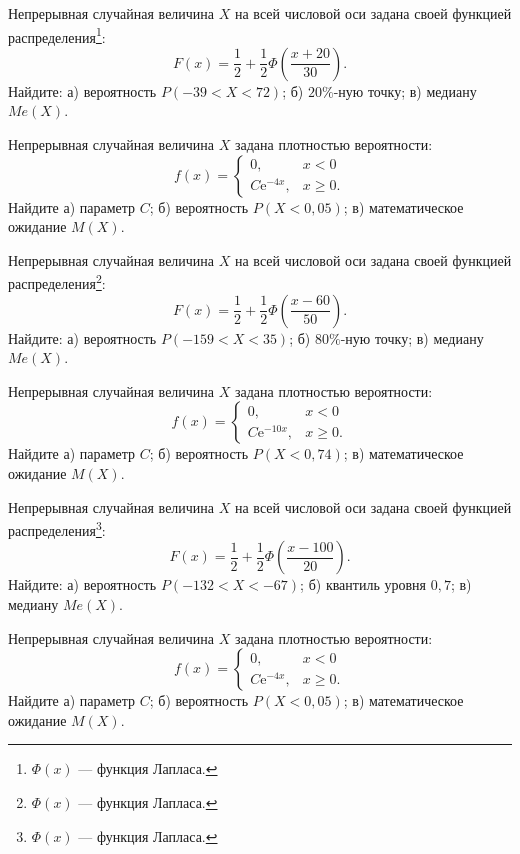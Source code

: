 \vfill

\newpage\setcounter{zad}{0}

\z Непрерывная случайная величина $X$ на всей числовой оси задана своей функцией распределения\footnote{$\Phi(x)$ --- функция Лапласа.}: $$ F(x) = \frac{1}{2} + \frac{1}{2}\Phi\left( \frac{x + 20}{30} \right). $$ Найдите: а) вероятность $P(-39 < X < 72)$; б) $20\%$-ную точку; в) медиану $Me(X)$.


\vfill

\z Непрерывная случайная величина $X$ задана плотностью вероятности: $$ f(x) = \begin{cases}0, & x < 0 \\ C\mathrm{e}^{-4x}, & x \geqslant 0.\end{cases} $$ Найдите а) параметр $C$; б) вероятность $P(X < 0{,}05)$; в) математическое ожидание $M(X)$.
 

\vfill

\newpage\setcounter{zad}{0}

\z Непрерывная случайная величина $X$ на всей числовой оси задана своей функцией распределения\footnote{$\Phi(x)$ --- функция Лапласа.}: $$ F(x) = \frac{1}{2} + \frac{1}{2}\Phi\left( \frac{x - 60}{50} \right). $$ Найдите: а) вероятность $P(-159 < X < 35)$; б) $80\%$-ную точку; в) медиану $Me(X)$.


\vfill

\z Непрерывная случайная величина $X$ задана плотностью вероятности: $$ f(x) = \begin{cases}0, & x < 0 \\ C\mathrm{e}^{-10x}, & x \geqslant 0.\end{cases} $$ Найдите а) параметр $C$; б) вероятность $P(X < 0{,}74)$; в) математическое ожидание $M(X)$.
 

\vfill

\newpage\setcounter{zad}{0}

\z Непрерывная случайная величина $X$ на всей числовой оси задана своей функцией распределения\footnote{$\Phi(x)$ --- функция Лапласа.}: $$ F(x) = \frac{1}{2} + \frac{1}{2}\Phi\left( \frac{x - 100}{20} \right). $$ Найдите: а) вероятность $P(-132 < X < -67)$; б) квантиль уровня $0{,}7$; в) медиану $Me(X)$.


\vfill

\z Непрерывная случайная величина $X$ задана плотностью вероятности: $$ f(x) = \begin{cases}0, & x < 0 \\ C\mathrm{e}^{-4x}, & x \geqslant 0.\end{cases} $$ Найдите а) параметр $C$; б) вероятность $P(X < 0{,}05)$; в) математическое ожидание $M(X)$.
 

